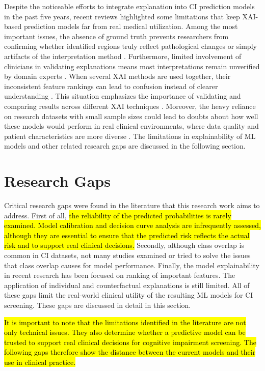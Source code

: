Despite the noticeable efforts to integrate explanation into CI prediction models in the past five years, recent reviews highlighted some limitations that keep XAI-based prediction models far from real medical utilization. Among the most important issues, the absence of ground truth prevents researchers from confirming whether identified regions truly reflect pathological changes or simply artifacts of the interpretation method \cite{Martin2023Interpretable, Viswan2024Explainable}. Furthermore, limited involvement of clinicians in validating explanations means most interpretations remain unverified by domain experts \cite{Martin2023Interpretable}. When several XAI methods are used together, their inconsistent feature rankings can lead to confusion instead of clearer understanding \cite{Viswan2024Explainable}. This situation emphasizes the importance of validating and comparing results across different XAI techniques \cite{abbas2024Explainable}. Moreover, the heavy reliance on research datasets with small sample sizes could lead to doubts about how well these models would perform in real clinical environments, where data quality and patient characteristics are more diverse \cite{Martin2023Interpretable, Viswan2024Explainable}. The limitations in explainability of ML models and other related research gaps are discussed in the following section.

\section{Research Gaps}
Critical research gaps were found in the literature that this research work aims to address. First of all, \hl{the reliability of the predicted probabilities is rarely examined. Model calibration and decision curve analysis are infrequently assessed, although they are essential to ensure that the predicted risk reflects the actual risk and to support real clinical decisions.} Secondly, although class overlap is common in CI datasets, not many studies examined or tried to solve the issues that class overlap causes for model performance. Finally, the model explainability in recent research has been focused on ranking of important features. The application of individual and counterfactual explanations is still limited. All of these gaps limit the real-world clinical utility of the resulting ML models for CI screening. These gaps are discussed in detail in this section.

\hl{It is important to note that the limitations identified in the literature are not only technical issues. They also determine whether a predictive model can be trusted to support real clinical decisions for cognitive impairment screening. The following gaps therefore show the distance between the current models and their use in clinical practice.} 

